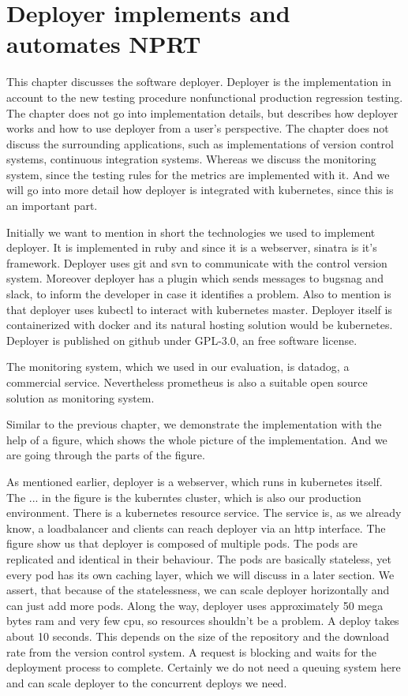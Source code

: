 \chapter{Deployer implements and automates NPRT}

This chapter discusses the software deployer. Deployer is the implementation in account to
the new testing procedure nonfunctional production regression testing. The chapter does
not go into implementation details, but describes how deployer works and how to use
deployer from a user's perspective. The chapter does not discuss the surrounding
applications, such as implementations of version control systems, continuous integration
systems. Whereas we discuss the monitoring system, since the testing rules for the metrics
are implemented with it. And we will go into more detail how deployer is integrated with
kubernetes, since this is an important part.

Initially we want to mention in short the technologies we used to implement deployer. It
is implemented in ruby and since it is a webserver, sinatra is it's framework. Deployer
uses git and svn to communicate with the control version system. Moreover deployer has a
plugin which sends messages to bugsnag and slack, to inform the developer in case it
identifies a problem. Also to mention is that deployer uses kubectl to interact with
kubernetes master. Deployer itself is containerized with docker and its natural hosting
solution would be kubernetes. Deployer is published on github under GPL-3.0, an free
software license.

The monitoring system, which we used in our evaluation, is datadog, a commercial
service. Nevertheless prometheus is also a suitable open source solution as monitoring
system.

Similar to the previous chapter, we demonstrate the implementation with the help of
a figure, which shows the whole picture of the implementation. And we are going through
the parts of the figure.

As mentioned earlier, deployer is a webserver, which runs in kubernetes itself. The ... in
the figure is the kuberntes cluster, which is also our production environment. There is a
kubernetes resource service. The service is, as we already know, a loadbalancer and
clients can reach deployer via an http interface. The figure show us that deployer is
composed of multiple pods. The pods are replicated and identical in their behaviour. The
pods are basically stateless, yet every pod has its own caching layer, which we will
discuss in a later section. We assert, that because of the statelessness, we can scale
deployer horizontally and can just add more pods. Along the way, deployer uses
approximately 50 mega bytes ram and very few cpu, so resources shouldn't be a problem. A
deploy takes about 10 seconds. This depends on the size of the repository and the download
rate from the version control system. A request is blocking and waits for the deployment
process to complete. Certainly we do not need a queuing system here and can scale deployer
to the concurrent deploys we need.

